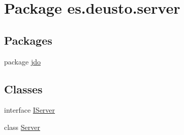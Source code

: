 \hypertarget{namespacees_1_1deusto_1_1server}{}\section{Package es.\+deusto.\+server}
\label{namespacees_1_1deusto_1_1server}
\subsection*{Packages}
\begin{DoxyCompactItemize}
\item 
package \mbox{\hyperlink{namespacees_1_1deusto_1_1server_1_1jdo}{jdo}}
\end{DoxyCompactItemize}
\subsection*{Classes}
\begin{DoxyCompactItemize}
\item 
interface \mbox{\hyperlink{interfacees_1_1deusto_1_1server_1_1_i_server}{I\+Server}}
\item 
class \mbox{\hyperlink{classes_1_1deusto_1_1server_1_1_server}{Server}}
\end{DoxyCompactItemize}
